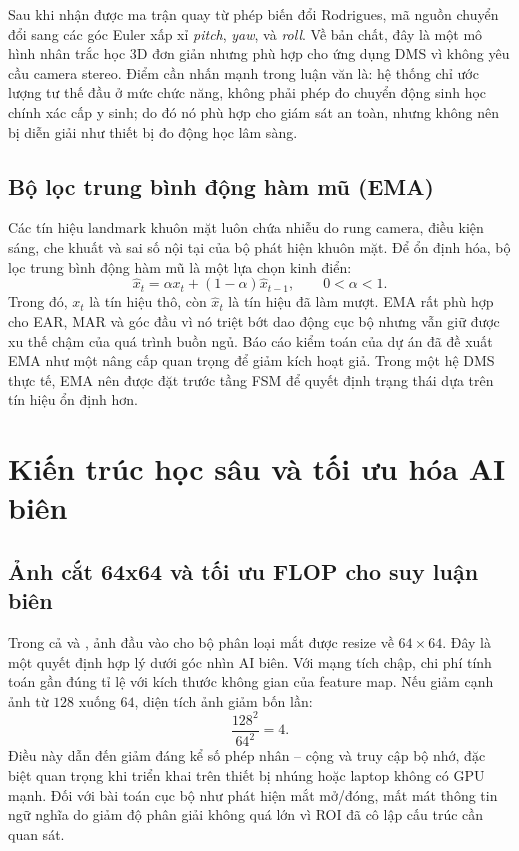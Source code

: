\documentclass[12pt,a4paper]{article}
\begin{document}
Sau khi nhận được ma trận quay từ phép biến đổi Rodrigues, mã nguồn chuyển đổi sang các góc Euler xấp xỉ \textit{pitch}, \textit{yaw}, và \textit{roll}. Về bản chất, đây là một mô hình nhân trắc học 3D đơn giản nhưng phù hợp cho ứng dụng DMS vì không yêu cầu camera stereo. Điểm cần nhấn mạnh trong luận văn là: hệ thống chỉ ước lượng tư thế đầu ở mức chức năng, không phải phép đo chuyển động sinh học chính xác cấp y sinh; do đó nó phù hợp cho giám sát an toàn, nhưng không nên bị diễn giải như thiết bị đo động học lâm sàng.

\subsection{Bộ lọc trung bình động hàm mũ (EMA)}
Các tín hiệu landmark khuôn mặt luôn chứa nhiễu do rung camera, điều kiện sáng, che khuất và sai số nội tại của bộ phát hiện khuôn mặt. Để ổn định hóa, bộ lọc trung bình động hàm mũ là một lựa chọn kinh điển:
\[
\hat{x}_t = \alpha x_t + (1-\alpha)\hat{x}_{t-1}, \qquad 0 < \alpha < 1.
\]
Trong đó, \(x_t\) là tín hiệu thô, còn \(\hat{x}_t\) là tín hiệu đã làm mượt. EMA rất phù hợp cho EAR, MAR và góc đầu vì nó triệt bớt dao động cục bộ nhưng vẫn giữ được xu thế chậm của quá trình buồn ngủ. Báo cáo kiểm toán của dự án đã đề xuất EMA như một nâng cấp quan trọng để giảm kích hoạt giả. Trong một hệ DMS thực tế, EMA nên được đặt trước tầng FSM để quyết định trạng thái dựa trên tín hiệu ổn định hơn.

\section{Kiến trúc học sâu và tối ưu hóa AI biên}
\subsection{Ảnh cắt 64x64 và tối ưu FLOP cho suy luận biên}
Trong cả  và , ảnh đầu vào cho bộ phân loại mắt được resize về \(64\times64\). Đây là một quyết định hợp lý dưới góc nhìn AI biên. Với mạng tích chập, chi phí tính toán gần đúng tỉ lệ với kích thước không gian của feature map. Nếu giảm cạnh ảnh từ \(128\) xuống \(64\), diện tích ảnh giảm bốn lần:
\[
\frac{128^2}{64^2} = 4.
\]
Điều này dẫn đến giảm đáng kể số phép nhân -- cộng và truy cập bộ nhớ, đặc biệt quan trọng khi triển khai trên thiết bị nhúng hoặc laptop không có GPU mạnh. Đối với bài toán cục bộ như phát hiện mắt mở/đóng, mất mát thông tin ngữ nghĩa do giảm độ phân giải không quá lớn vì ROI đã cô lập cấu trúc cần quan sát.
\end{document}
